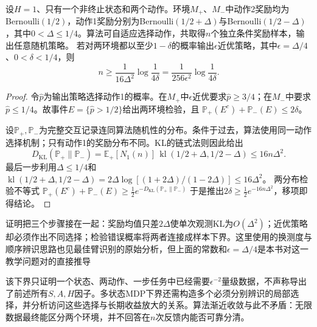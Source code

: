 \begin{theorem}[一步决策的辨识下界]
  \label{thm:rl-learning-two-instance-lower}
  设$H=1$、只有一个非终止状态和两个动作。环境$M_+$、$M_-$中动作2奖励均为Bernoulli$(1/2)$，动作1奖励分别为Bernoulli$(1/2+\Delta)$与Bernoulli$(1/2-\Delta)$，其中$0<\Delta\leq1/4$。算法可自适应选择动作，共取得$n$个独立条件奖励样本，输出任意随机策略。
  若对两环境都以至少$1-\delta$的概率输出$\epsilon$近优策略，其中$\epsilon=\Delta/4$、$0<\delta<1/4$，则
  \[
     n\geq\frac{1}{16\Delta^2}\log\frac1{4\delta}
       =\frac{1}{256\epsilon^2}\log\frac1{4\delta}.
  \]
\end{theorem}

\begin{proof}
  令$\widehat p$为输出策略选择动作1的概率。在$M_+$中$\epsilon$近优要求$\widehat p\geq3/4$；在$M_-$中要求$\widehat p\leq1/4$。故事件$E=\{\widehat p>1/2\}$给出两环境检验，且
  $\mathbb P_+(E^c)+\mathbb P_-(E)\leq2\delta$。

  设$\mathbb P_+,\mathbb P_-$为完整交互记录连同算法随机性的分布。条件于过去，算法使用同一动作选择机制；只有动作1的奖励分布不同。KL的链式法则因此给出
  \[
   D_{\mathrm{KL}}(\mathbb P_+\|\mathbb P_-)
    =\mathbb E_+[N_1(n)]\,
       \operatorname{kl}(1/2+\Delta,1/2-\Delta)
    \leq16n\Delta^2.
  \]
  最后一步利用$\Delta\leq1/4$和
  $\operatorname{kl}(1/2+\Delta,1/2-\Delta)
   =2\Delta\log[(1+2\Delta)/(1-2\Delta)]\leq16\Delta^2$。
  两分布检验不等式
  $\mathbb P_+(E^c)+\mathbb P_-(E)
       \geq\tfrac12e^{-D_{\mathrm{KL}}(\mathbb P_+\|\mathbb P_-)}$
  于是推出$2\delta\geq\tfrac12e^{-16n\Delta^2}$，移项即得结论。
\end{proof}

证明把三个步骤接在一起：奖励均值只差$2\Delta$使单次观测KL为$O(\Delta^2)$；近优策略却必须作出不同选择；检验错误概率将两者连接成样本下界。这里使用的换测度与顺序辨识思路也见最佳臂识别的原始分析，但上面的常数和$\epsilon=\Delta/4$是本书对这一教学问题对的直接推导

该下界只证明一个状态、两动作、一步任务中已经需要$\epsilon^{-2}$量级数据，不声称导出了前述所有$S,A,H$因子。多状态MDP下界还需构造多个必须分别辨识的局部选择，并分析访问这些选择与长期收益放大的关系。算法渐近收敛与此不矛盾：无限数据最终能区分两个环境，并不回答在$n$次反馈内能否可靠分清。

